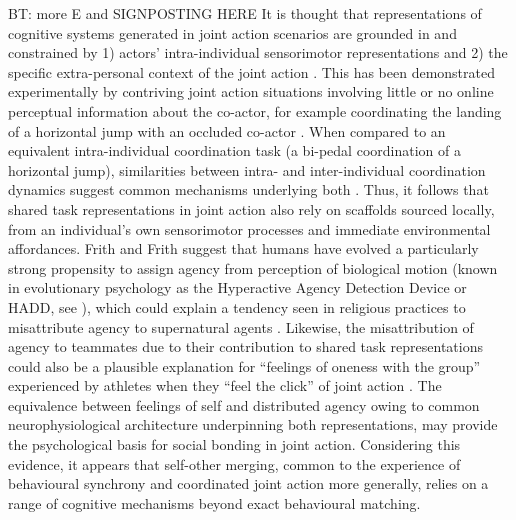 BT: more E and SIGNPOSTING HERE
It is thought that representations of cognitive systems generated in joint action scenarios are grounded in and constrained by 1) actors' intra-individual sensorimotor representations and 2) the specific extra-personal context of the joint action \citep{Sebanz2006}.  This has been demonstrated experimentally by contriving joint action situations involving little or no online perceptual information about the co-actor, for example coordinating the landing of a horizontal jump with an occluded co-actor \citep{Vesper2012}. When compared to an equivalent intra-individual coordination task (a bi-pedal coordination of a horizontal jump), similarities between intra- and inter-individual coordination dynamics suggest common mechanisms underlying both \citep{Schmidt2008}.  Thus, it follows that shared task representations in joint action also rely on scaffolds sourced locally, from an individual's own sensorimotor processes and immediate environmental affordances\citep{Williams2009}.
Frith and Frith \textcite{Frith2010} suggest that humans have evolved a particularly strong propensity to assign agency from perception of biological motion (known in evolutionary psychology as the Hyperactive Agency Detection Device or HADD, see \cite{Barrett2000,Barrett2007}), which could explain a tendency seen in religious practices to misattribute agency to supernatural agents \citep{Atran2010}.  Likewise, the misattribution of agency to teammates due to their contribution to shared task representations could also be a plausible explanation for ``feelings of oneness with the group'' experienced by athletes when they ``feel the click'' of joint action \citep{Swann2009}. The equivalence between feelings of self and distributed agency owing to common neurophysiological architecture underpinning both representations, may provide the psychological basis for social bonding in joint action.  Considering this evidence, it appears that self-other merging, common to the experience of behavioural synchrony and coordinated joint action more generally, relies on a range of cognitive mechanisms beyond exact behavioural matching.

